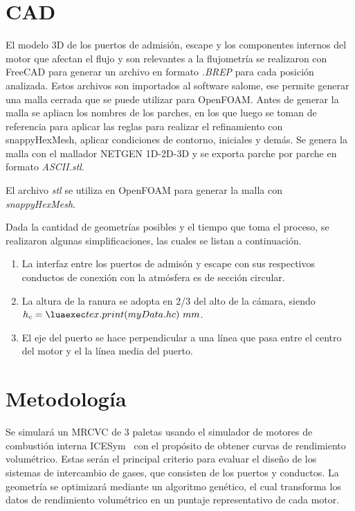 \section{CAD}
%
El modelo 3D de los puertos de admisión, escape y los componentes internos del
motor que afectan el flujo y son relevantes a la flujometría se realizaron con
FreeCAD\cite{freecad} para generar un archivo en formato \emph{.BREP} para cada
posición analizada.
%
Estos archivos son importados al software salome\cite{salome}, ese permite
generar una malla cerrada que se puede utilizar para OpenFOAM.\@
%
Antes de generar la malla se apliacn los nombres de los parches, en los que
luego se toman de referencia para aplicar las reglas para realizar el
refinamiento con snappyHexMesh, aplicar condiciones de contorno, iniciales y
demás.
%
Se genera la malla con el mallador NETGEN 1D-2D-3D y se exporta parche por
parche en formato \emph{ASCII.stl}.

%
El archivo \emph{stl} se utiliza en OpenFOAM para generar la malla con
\emph{snappyHexMesh}.

Dada la cantidad de geometrías posibles y el tiempo que toma el proceso, se
realizaron algunas simplificaciones, las cuales se listan a continuación.

%
\begin{enumerate}

    \item La interfaz entre los puertos de admisón y escape con sus respectivos
        conductos de conexión con la atmósfera es de sección circular.
    \item La altura de la ranura se adopta en 2/3 del alto de la cámara, siendo
        $h_c=\lua{tex.print(myData.hc)}\ mm$.
    \item El eje del puerto se hace perpendicular a una línea que pasa entre el
        centro del motor y el la línea media del puerto.

\end{enumerate}


\section{Metodología}
%
Se simulará un MRCVC de 3 paletas usando el simulador de motores de combustión
interna ICESym~\cite{icesym} con el propósito de obtener curvas de rendimiento
volumétrico.
%
Estas serán el principal criterio para evaluar el diseño de los sistemas de
intercambio de gases, que consisten de los puertos y conductos.
%
La geometría se optimizará mediante un algoritmo genético, el cual transforma
los datos de rendimiento volumétrico en un puntaje representativo de cada
motor.


